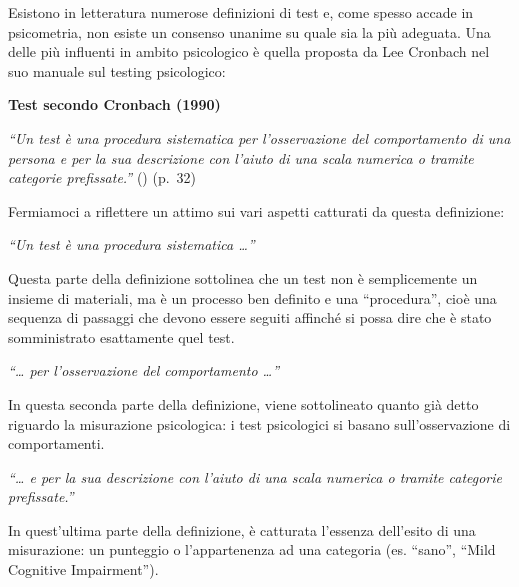 \documentclass[
  italian,
  letterpaper,
  paper=6in:9in,
  pagesize=pdftex,
  headinclude=on,
  footinclude=on,
  11pt]{scrbook}
\begin{document}
Esistono in letteratura numerose definizioni di test e, come spesso
accade in psicometria, non esiste un consenso unanime su quale sia la
più adeguata. Una delle più influenti in ambito psicologico è quella
proposta da Lee Cronbach nel suo manuale sul testing psicologico:

\begin{tcolorbox}[enhanced jigsaw, title=\textcolor{quarto-callout-note-color}{\faInfo}\hspace{0.5em}{Definizione}, coltitle=black, bottomtitle=1mm, colback=white, bottomrule=.15mm, rightrule=.15mm, breakable, toptitle=1mm, left=2mm, colbacktitle=quarto-callout-note-color!10!white, titlerule=0mm, colframe=quarto-callout-note-color-frame, leftrule=.75mm, opacitybacktitle=0.6, arc=.35mm, toprule=.15mm, opacityback=0]

\textbf{Test secondo Cronbach (1990)}

\emph{``Un test è una procedura sistematica per l'osservazione del
comportamento di una persona e per la sua descrizione con l'aiuto di una
scala numerica o tramite categorie prefissate.''}
(\cite{cronbach1990essentials}) (p.~32)

\end{tcolorbox}

Fermiamoci a riflettere un attimo sui vari aspetti catturati da questa
definizione:

\emph{``Un test è una procedura sistematica \ldots{}''}

Questa parte della definizione sottolinea che un test non è
semplicemente un insieme di materiali, ma è un processo ben definito e
una ``procedura'', cioè una sequenza di passaggi che devono essere
seguiti affinché si possa dire che è stato somministrato esattamente
quel test.

\emph{``\ldots{} per l'osservazione del comportamento \ldots{}''}

In questa seconda parte della definizione, viene sottolineato quanto già
detto riguardo la misurazione psicologica: i test psicologici si basano
sull'osservazione di comportamenti.

\emph{``\ldots{} e per la sua descrizione con l'aiuto di una scala
numerica o tramite categorie prefissate.''}

In quest'ultima parte della definizione, è catturata l'essenza
dell'esito di una misurazione: un punteggio o l'appartenenza ad una
categoria (es. ``sano'', ``Mild Cognitive Impairment'').
\end{document}
